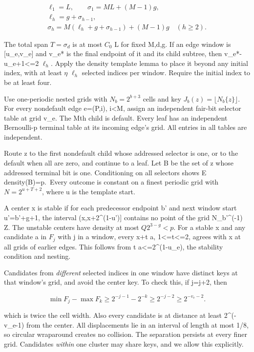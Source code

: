 \documentclass[
  11pt,
]{article}
\theoremstyle{remark}\newtheorem{remark}[theorem]{Remark}
\begin{document}
\[
\begin{gathered}\ell_1=L,\qquad\sigma_1=ML+(M-1)g,\\ \ell_h=g+\sigma_{h-1},\\ \sigma_h=M(\ell_h+g+\sigma_{h-1})+(M-1)g\quad(h\ge2).\end{gathered}
\]

The total span \(T=\sigma_d\) is at most \(C_0\) L for fixed M,d,g. If
an edge window is {[}u\_e,v\_e{]} and v\_e* is the final endpoint of it
and its child subtree, then v\_e*-u\_e+1\textless=2 \(\ell_h\). Apply
the density template lemma to place it beyond any initial index, with at
least \(\eta\) \(\ell_h\) selected indices per window. Require the
initial index to be at least four.

Use one-periodic nested grids with \(N_b=2^{b+3}\) cells and key
\(J_b(z)=\lfloor N_b\{z\}\rfloor\). For every nondefault edge e=(P,i),
i\textless M, assign an independent fair-bit selector table at grid
v\_e. The Mth child is default. Every leaf has an independent
Bernoulli-p terminal table at its incoming edge's grid. All entries in
all tables are independent.

Route z to the first nondefault child whose addressed selector is one,
or to the default when all are zero, and continue to a leaf. Let B be
the set of z whose addressed terminal bit is one. Conditioning on all
selectors shows E density(B)=p.~Every outcome is constant on a finest
periodic grid with \(N=2^{u+T+2}\), where u is the template start.

A center x is stable if for each predecessor endpoint b' and next window
start u'=b'+g+1, the interval (x,x+2\^{}(1-u'){]} contains no point of
the grid N\_b'\^{}(-1) Z. The unstable centers have density at most
\(Q2^{3-g}<p\). For a stable x and any candidate a in \(F_j\) with j in
a window, every x+t a, 1\textless=t\textless=2, agrees with x at all
grids of earlier edges. This follows from t a\textless=2\^{}(1-u\_e),
the stability condition and nesting.

Candidates from \emph{different} selected indices in one window have
distinct keys at that window's grid, and avoid the center key. To check
this, if j=j+2, then

\[
\min F_j-\max F_k\ge2^{-j-1}-2^{-k}\ge2^{-j-2}\ge2^{-v_e-2}.
\]

which is twice the cell width. Also every candidate is at distance at
least 2\^{}(-v\_e-1) from the center. All displacements lie in an
interval of length at most 1/8, so circular wraparound creates no
collision. The separation persists at every finer grid. Candidates
\emph{within} one cluster may share keys, and we allow this explicitly.
\end{document}
